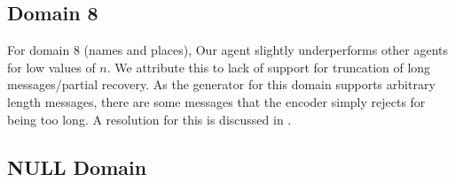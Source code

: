 \documentclass[titlepage]{article}
\begin{document}
\subsection{Domain 8}

For domain 8 (names and places), Our agent slightly underperforms other agents for low values of $n$. We attribute this to lack of support for truncation of long messages/partial recovery. As the generator for this domain supports arbitrary length messages, there are some messages that the encoder simply rejects for being too long. A resolution for this is discussed in .

\subsection{NULL Domain}
\end{document}
